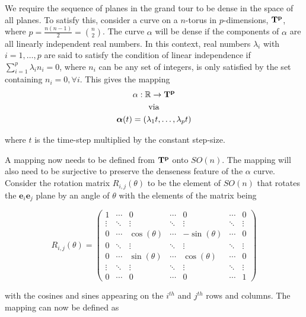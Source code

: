 \documentclass[a4paper,11pt,twoside]{article}
\begin{document}
We require the sequence of planes in the grand tour to be dense in the space of all planes. To satisfy this, consider a curve on a $n$-torus in $p$-dimensions, $\bf{T}^p$, where $p=\frac{n(n-1)}{2}={n \choose 2} $. The curve $\alpha$ will be dense if the components of $\alpha$ are all linearly independent real numbers. In this context, real numbers $\lambda_i$ with  $i=1,\dotsc,p$ are said to satisfy the condition of linear independence if $\sum_{i=1}^p \lambda_i n_i=0$, where $n_i$ can be any set of integers, is only satisfied by the set containing $n_i=0, \forall i$. This gives the mapping
\begin{equation}
\begin{gathered}
\alpha: \mathbb R \rightarrow \bf{T}^p
\\
\text{via}
\\
\bm{\alpha}(t)=(\lambda_1 t,\dotsc, \lambda_p t)
\end{gathered}
\end{equation}

where $t$ is the time-step multiplied by the constant step-size. 
\newline

A mapping now needs to be defined from $\bf{T}^p$ onto $SO(n)$. The mapping will also need to be surjective to preserve the denseness feature of the $\alpha$ curve. Consider the rotation matrix $R_{i,j}(\theta)$ to be the element of $SO(n)$ that rotates the $\bm{e}_i \bm{e}_j$ plane by an angle of $\theta$ with the elements of the matrix being

\begin{equation}
R_{i,j}(\theta) = 
\begin{pmatrix}
  1 &  \cdots & 0 & \cdots & 0 & \cdots &  0 \\
  \vdots  &  \ddots & \vdots& \ddots &\vdots&\ddots&\vdots  \\
  0 & \cdots & \cos{(\theta)} & \cdots & -\sin{(\theta)} &  \cdots & 0 \\
  0&\ddots&\vdots&\ddots&\vdots&\ddots&\vdots\\
  0 &  \cdots & \sin{(\theta)}&\cdots & \cos{(\theta)} &  \cdots & 0 \\
  \vdots  &  \ddots & \vdots&\ddots& \vdots &\ddots&\vdots  \\
  0 & \cdots & 0 & \cdots&0 & \cdots & 1
 \end{pmatrix}
\end{equation}

with the cosines and sines appearing on the $i^{th}$ and $j^{th}$ rows and columns. The mapping can now be defined as
\end{document}
